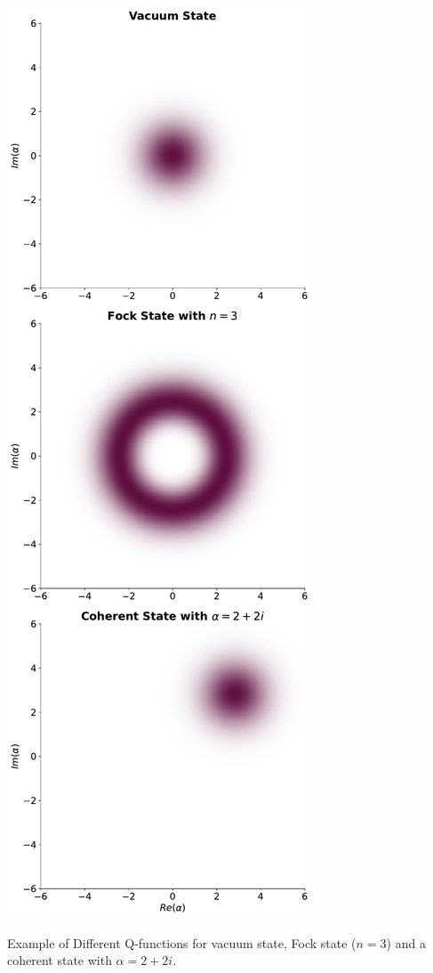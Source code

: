 \begin{marginfigure}[-6 cm]
    \centering
    \includegraphics{Figs/Theory/Q_functions.pdf}
    \caption{Example of Different Q-functions for vacuum state, Fock state ($n = 3$) and a coherent state with $\alpha = 2 + 2i$.}
    \label{fig:Q_func_examples}
\end{marginfigure}


